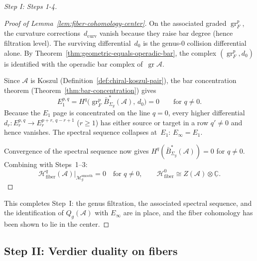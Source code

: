 \begin{proof}[Step I: Steps 1-4]
\begin{proof}[Proof of Lemma~\ref{lem:fiber-cohomology-center}]
On the associated graded $\operatorname{gr}^p_F$, the curvature
corrections~$d_{\mathrm{curv}}$ vanish because they raise bar degree
(hence filtration level).  The surviving differential~$d_0$ is the
genus-$0$ collision differential alone.  By
Theorem~\ref{thm:geometric-equals-operadic-bar}, the complex
$(\operatorname{gr}^p_F, d_0)$ is identified with the operadic bar
complex of~$\operatorname{gr}\mathcal{A}$.

Since $\mathcal{A}$ is Koszul
(Definition~\ref{def:chiral-koszul-pair}), the bar concentration
theorem (Theorem~\ref{thm:bar-concentration}) gives
\[
E_1^{p,q}
= H^q\bigl(\operatorname{gr}^p_F
  \bar{B}^*_{\Sigma_g}(\mathcal{A}),\, d_0\bigr)
= 0
\qquad\text{for } q \neq 0.
\]
Because the $E_1$ page is concentrated on the line $q=0$, every
higher differential
$d_r\colon E_r^{p,q} \to E_r^{p+r,\,q-r+1}$
($r \geq 1$) has either source or target in a row $q'\neq 0$ and
hence vanishes.  The spectral sequence collapses at~$E_1$:
$E_\infty = E_1$.

Convergence of the spectral sequence now gives
$H^q(\bar{B}^*_{\Sigma_g}(\mathcal{A})) = 0$ for $q \neq 0$.
Combining with Steps~1--3:
\begin{equation}\label{eq:fiber-cohomology-concentration}
\mathcal{H}^q_{\mathrm{fiber}}(\mathcal{A})
\big|_{\mathcal{M}_g^{\mathrm{smooth}}} = 0
\quad\text{for } q \neq 0,
\qquad
\mathcal{H}^0_{\mathrm{fiber}}
\cong Z(\mathcal{A}) \otimes \underline{\mathbb{C}}.
\end{equation}
\end{proof}

This completes Step~I: the genus filtration, the associated spectral
sequence, and the identification of $Q_g(\mathcal{A})$ with $E_\infty$
are in place, and the fiber cohomology has been shown to lie in the center.
\end{proof}

\subsection{Step II: Verdier duality on fibers}

